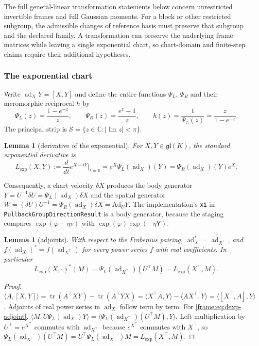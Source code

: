 \documentclass[11pt]{article}
\newtheorem{lemma}[theorem]{Lemma}
\theoremstyle{definition}
\theoremstyle{remark}
\providecommand{\gl}{\mathfrak{gl}}
\providecommand{\tr}{\operatorname{tr}}
\providecommand{\ad}{\operatorname{ad}}
\providecommand{\C}{\mathbb{C}}
\providecommand{\Ad}{\mathrm{Ad}}
\providecommand{\Imag}{\operatorname{Im}}
\providecommand{\ip}[2]{\langle #1, #2\rangle}
\begin{document}
The full general-linear transformation statements below concern unrestricted invertible frames and full Gaussian moments. For a block or other restricted subgroup, the admissible changes of reference basis must preserve that subgroup and the declared family. A transformation can preserve the underlying frame matrices while leaving a single exponential chart, so chart-domain and finite-step claims require their additional hypotheses.

\subsubsection{The exponential chart}

Write $\ad_XY=[X,Y]$ and define the entire functions $\Psi_L$, $\Psi_R$ and their meromorphic reciprocal $h$ by
\begin{equation}\label{frame:eq:psi}
\Psi_L(z)=\frac{1-e^{-z}}{z},\qquad \Psi_R(z)=\frac{e^{z}-1}{z},\qquad h(z)=\frac{1}{\Psi_L(z)}=\frac{z}{1-e^{-z}}.
\end{equation}
The principal strip is $\mathcal{S}=\{z\in\C:|\Imag z|<\pi\}$.

\begin{lemma}[derivative of the exponential]\label{frame:lem:dexp}
For $X,Y\in\gl(K)$, the standard exponential derivative \cite[Ch.~5]{frame:Hall2015} is
\begin{equation}\label{frame:eq:dexp}
L_{\exp}(X,Y):=\frac{d}{dt}e^{X+tY}\Big|_{t=0}=e^X\Psi_L(\ad_X)(Y)=\Psi_R(\ad_X)(Y)e^X.
\end{equation}
\end{lemma}

Consequently, a chart velocity $\delta X$ produces the body generator $Y=U^{-1}\delta U=\Psi_L(\ad_X)\delta X$ and the spatial generator $W=(\delta U)U^{-1}=\Psi_R(\ad_X)\delta X=\Ad_UY$. The implementation's \texttt{xi} in \texttt{PullbackGroupDirectionResult} is a body generator, because the staging compares $\exp(\varphi-\eta v)$ with $\exp(\varphi)\exp(-\eta\mathsf{Y})$.

\begin{lemma}[adjoints]\label{frame:lem:adjoint}
With respect to the Frobenius pairing, $\ad_X^*=\ad_{X^\top}$, and $f(\ad_X)^*=f(\ad_{X^\top})$ for every power series $f$ with real coefficients. In particular
\begin{equation}\label{frame:eq:dexp-adjoint}
L_{\exp}(X,\cdot)^*(M)=\Psi_L(\ad_{X^\top})(U^\top M)=L_{\exp}(X^\top,M).
\end{equation}
\end{lemma}
\begin{proof}
$\ip{A}{[X,Y]}=\tr(A^\top XY)-\tr(A^\top YX)=\ip{X^\top A}{Y}-\ip{AX^\top}{Y}=\ip{[X^\top,A]}{Y}$. Adjoints of real power series in $\ad_X$ follow term by term. For \eqref{frame:eq:dexp-adjoint}, $\ip{M}{U\Psi_L(\ad_X)Y}=\ip{\Psi_L(\ad_{X^\top})(U^\top M)}{Y}$. Left multiplication by $U^\top=e^{X^\top}$ commutes with $\ad_{X^\top}$ because $e^{X^\top}$ commutes with $X^\top$, so $\Psi_L(\ad_{X^\top})(U^\top M)=U^\top\Psi_L(\ad_{X^\top})M=L_{\exp}(X^\top,M)$.
\end{proof}
\end{document}
